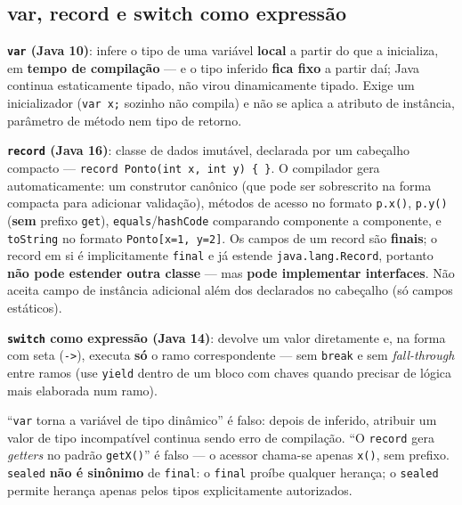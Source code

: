 \subsection{var, record e switch como expressão}

\begin{conceito}
\textbf{\texttt{var} (Java 10)}: infere o tipo de uma variável
\textbf{local} a partir do que a inicializa, em \textbf{tempo de
compilação} --- e o tipo inferido \textbf{fica fixo} a partir daí; Java
continua estaticamente tipado, não virou dinamicamente tipado. Exige um
inicializador (\texttt{var x;} sozinho não compila) e não se aplica a
atributo de instância, parâmetro de método nem tipo de retorno.

\textbf{\texttt{record} (Java 16)}: classe de dados imutável, declarada
por um cabeçalho compacto --- \texttt{record Ponto(int x, int y) \{ \}}.
O compilador gera automaticamente: um construtor canônico (que pode ser
sobrescrito na forma compacta para adicionar validação), métodos de
acesso no formato \texttt{p.x()}, \texttt{p.y()} (\textbf{sem} prefixo
\texttt{get}), \texttt{equals}/\texttt{hashCode} comparando componente a
componente, e \texttt{toString} no formato \texttt{Ponto[x=1, y=2]}. Os
campos de um record são \textbf{finais}; o record em si é implicitamente
\texttt{final} e já estende \texttt{java.lang.Record}, portanto
\textbf{não pode estender outra classe} --- mas \textbf{pode implementar
interfaces}. Não aceita campo de instância adicional além dos declarados
no cabeçalho (só campos estáticos).

\textbf{\texttt{switch} como expressão (Java 14)}: devolve um valor
diretamente e, na forma com seta (\texttt{->}), executa \textbf{só} o
ramo correspondente --- sem \texttt{break} e sem \textit{fall-through}
entre ramos (use \texttt{yield} dentro de um bloco com chaves quando
precisar de lógica mais elaborada num ramo).
\end{conceito}

\begin{cuidado}
“\texttt{var} torna a variável de tipo dinâmico” é falso: depois de
inferido, atribuir um valor de tipo incompatível continua sendo erro de
compilação. “O \texttt{record} gera \textit{getters} no padrão
\texttt{getX()}” é falso --- o acessor chama-se apenas \texttt{x()}, sem
prefixo. \texttt{sealed} \textbf{não é sinônimo} de \texttt{final}: o
\texttt{final} proíbe qualquer herança; o \texttt{sealed} permite herança
apenas pelos tipos explicitamente autorizados.
\end{cuidado}

